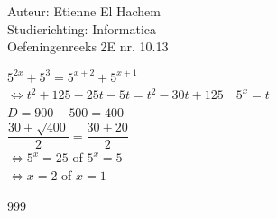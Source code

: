 \documentclass[a4paper]{article}
\begin{document}
  
\noindent \large Auteur: Etienne El Hachem \\
\noindent \large Studierichting: Informatica\\
\noindent \large Oefeningenreeks 2E nr. 10.13\\

\medskip

\normalsize

$5^{2x} + 5^3 = 5^{x+2} + 5^{x+1}$ \\

$\Leftrightarrow t^2 + 125 -25t -5t = t^2 -30t +125 \quad 5^x = t$ \\

$D = 900 - 500 = 400$ \\

$\dfrac{30\pm\sqrt{400}}{2} = \dfrac{30\pm20}{2}$ \\

$\Leftrightarrow 5^x = 25$ of $5^x = 5$ \\

$\Leftrightarrow x = 2$ of $x = 1$

\begin{thebibliography}{999}
\end{thebibliography}
\end{document}
